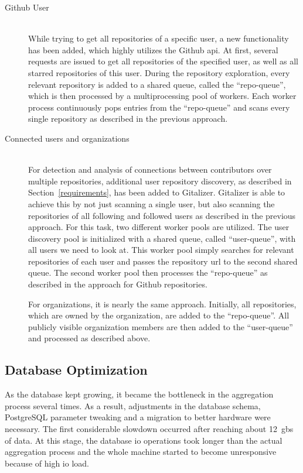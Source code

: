 \begin{description}
    \item[Github User]\label{github-repo-scan} \hfill \\
        While trying to get all repositories of a specific user, a new functionality has been added, which highly utilizes the Github \ac{api}.
        At first, several requests are issued to get all repositories of the specified user, as well as all starred repositories of this user.
        During the repository exploration, every relevant repository is added to a shared queue, called the ``repo-queue'', which is then processed by a multiprocessing pool of workers.
        Each worker process continuously pops entries from the ``repo-queue'' and scans every single repository as described in the previous approach.


    \item[Connected users and organizations]\label{github-repo-scan} \hfill \\
        For detection and analysis of connections between contributors over multiple repositories, additional user repository discovery, as described in Section~\ref{requirements}, has been added to Gitalizer.
        Gitalizer is able to achieve this by not just scanning a single user, but also scanning the repositories of all following and followed users as described in the previous approach.
        For this task, two different worker pools are utilized.
        The user discovery pool is initialized with a shared queue, called ``user-queue'', with all users we need to look at.
        This worker pool simply searches for relevant repositories of each user and passes the repository \ac{url} to the second shared queue.
        The second worker pool then processes the ``repo-queue'' as described in the approach for Github repositories.

        For organizations, it is nearly the same approach.
        Initially, all repositories, which are owned by the organization, are added to the ``repo-queue''.
        All publicly visible organization members are then added to the ``user-queue'' and processed as described above.
\end{description}


\subsection{Database Optimization}
As the database kept growing, it became the bottleneck in the aggregation process several times.
As a result, adjustments in the database schema, PostgreSQL parameter tweaking and a migration to better hardware were necessary.
The first considerable slowdown occurred after reaching about 12~\acp{gb} of data.
At this stage, the database \ac{io} operations took longer than the actual aggregation process and the whole machine started to become unresponsive because of high \ac{io} load.


